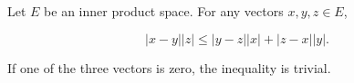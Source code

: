 Let $E$ be an inner product space. For any vectors $x, y, z \in E$,

$$|x - y| |z| \leq |y - z| |x| + |z - x| |y|.$$

If one of the three vectors is zero, the inequality is trivial.

